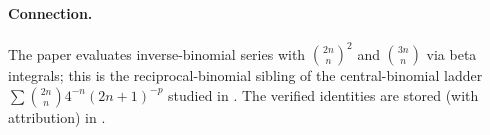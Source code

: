 \paragraph{Connection.} The paper evaluates inverse-binomial series with $\binom{2n}{n}^{\!2}$ and
$\binom{3n}{n}$ via beta integrals; this is the reciprocal-binomial sibling of the central-binomial
ladder $\sum\binom{2n}{n}4^{-n}(2n{+}1)^{-p}$ studied in .
The verified identities are stored (with attribution) in
.


